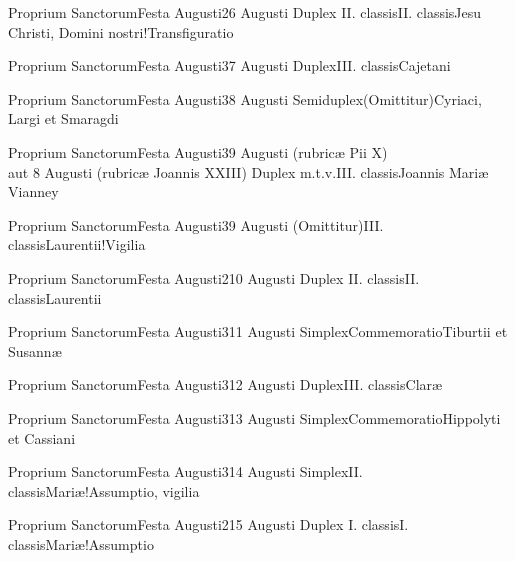 \documentclass[psalterium-feriale.tex]{subfiles}
\begin{document}
	{Proprium Sanctorum}{Festa Augusti}{2}{6 Augusti}
	{Duplex II. classis}{II. classis}{Jesu Christi, Domini nostri!Transfiguratio}
	{}
	{}
\psalmodiapropria

	{Proprium Sanctorum}{Festa Augusti}{3}{7 Augusti}
	{Duplex}{III. classis}{Cajetani}
	{}
	{}
\COPObRubric

	{Proprium Sanctorum}{Festa Augusti}{3}{8 Augusti}
	{Semiduplex}{(Omittitur)}{Cyriaci, Largi et Smaragdi}
	{}
	{}
\PMEXaRubric

	{Proprium Sanctorum}{Festa Augusti}{3}{9 Augusti (rubricæ Pii X)\\aut 8 Augusti (rubricæ Joannis XXIII)}
	{Duplex m.t.v.}{III. classis}{Joannis Mariæ Vianney}
	{}
	{}
\COPOcRubric

	{Proprium Sanctorum}{Festa Augusti}{3}{9 Augusti}
	{(Omittitur)}{III. classis}{Laurentii!Vigilia}
	{}
	{}
\feriaRubric

	{Proprium Sanctorum}{Festa Augusti}{2}{10 Augusti}
	{Duplex II. classis}{II. classis}{Laurentii}
	{}
	{}
\psalmodiapropria

	{Proprium Sanctorum}{Festa Augusti}{3}{11 Augusti}
	{Simplex}{Commemoratio}{Tiburtii et Susannæ}
	{}
	{}
\PMEXaRubric

	{Proprium Sanctorum}{Festa Augusti}{3}{12 Augusti}
	{Duplex}{III. classis}{Claræ}
	{}
	{}
\MUVNbRubric

	{Proprium Sanctorum}{Festa Augusti}{3}{13 Augusti}
	{Simplex}{Commemoratio}{Hippolyti et Cassiani}
	{}
	{}
\PMEXaRubric

	{Proprium Sanctorum}{Festa Augusti}{3}{14 Augusti}
	{Simplex}{II. classis}{Mariæ!Assumptio, vigilia}
	{}
	{}
\feriaRubric

	{Proprium Sanctorum}{Festa Augusti}{2}{15 Augusti}
	{Duplex I. classis}{I. classis}{Mariæ!Assumptio}
	{}
	{}
\psalmodiapropria
{}
\end{document}
